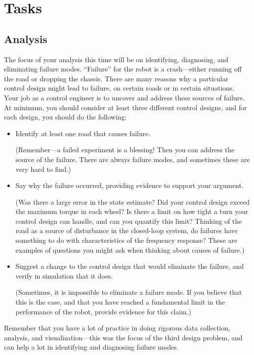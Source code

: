 \documentclass[12pt]{article}
\begin{document}
\section{Tasks}


\subsection{Analysis}
\label{secAnalysis}


The focus of your analysis this time will be on identifying, diagnosing, and eliminating failure modes. ``Failure'' for the robot is a crash---either running off the road or dropping the chassis. There are many reasons why a particular control design might lead to failure, on certain roads or in certain situations. Your job as a control engineer is to uncover and address these sources of failure. At minimum, you should consider at least three different control designs, and for each design, you should do the following:
\begin{itemize}
\item Identify at least one road that causes failure.

(Remember---a failed experiment is a blessing! Then you can address the source of the failure. There are always failure modes, and sometimes these are very hard to find.)

\item Say why the failure occurred, providing evidence to support your argument.

(Was there a large error in the state estimate? Did your control design exceed the maximum torque in each wheel? Is there a limit on how tight a turn your control design can handle, and can you quantify this limit? Thinking of the road as a source of disturbance in the closed-loop system, do failures have something to do with characteristics of the frequency response? These are examples of questions you might ask when thinking about causes of failure.)

\item Suggest a change to the control design that would eliminate the failure, and verify in simulation that it does.

(Sometimes, it is impossible to eliminate a failure mode. If you believe that this is the case, and that you have reached a fundamental limit in the performance of the robot, provide evidence for this claim.)

\end{itemize}
Remember that you have a lot of practice in doing rigorous data collection, analysis, and visualization---this was the focus of the third design problem, and can help a lot in identifying and diagnosing failure modes.
\end{document}
